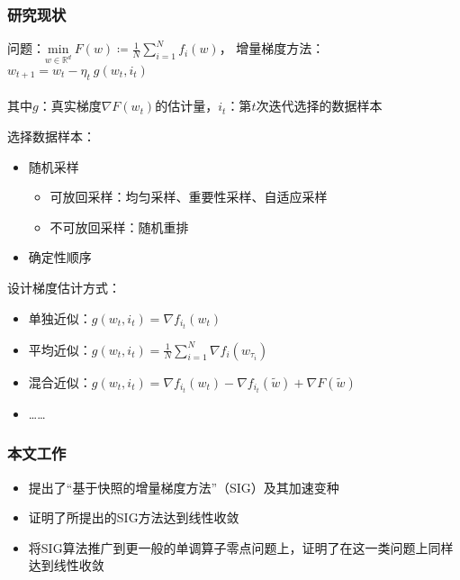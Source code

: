\frame
{
\frametitle{研究现状}
\footnotesize
问题：$\underset{w \in \mathbb{R}^d}{\text{min}} \ F(w) \coloneqq \frac{1}{N} \sum_{i=1}^N f_i(w) $， \pause 增量梯度方法：$w_{t+1} = w_t - \eta_t \ g(w_t, i_t)$ \\~\\
\pause 其中$g$：真实梯度$\nabla F(w_t)$的估计量，$i_t$：第$t$次迭代选择的数据样本

\pause

\begin{block}{}
选择数据样本：
\begin{itemize}
    \item 随机采样
    \begin{itemize}
        \item \alert<6>{可放回采样}：均匀采样、重要性采样、自适应采样
        \item 不可放回采样：随机重排
    \end{itemize}
    \item 确定性顺序
\end{itemize}
\end{block}

\pause

\begin{block}{}
设计梯度估计方式：
\begin{itemize}
    \item 单独近似：$g(w_t, i_t) = \nabla f_{i_t}(w_t)$
    \item \alert<6>{平均近似}：$g(w_t, i_t) = \frac{1}{N}\sum_{i=1}^N\nabla f_i(w_{\tau_i})$
    \item \alert<6>{混合近似}：$g(w_t, i_t) = \nabla f_{i_t}(w_t) - \nabla f_{i_t}(\tilde{w}) + \nabla F(\tilde{w})$
    \item \alert<6>{……}
\end{itemize}
\end{block}

}

\frame
{
\frametitle{本文工作}
\begin{itemize}
  \item 提出了“基于快照的增量梯度方法”（SIG）及其加速变种 \vspace*{1em}
  \item 证明了所提出的SIG方法达到线性收敛 \vspace*{1em}
  \item 将SIG算法推广到更一般的单调算子零点问题上，证明了在这一类问题上同样达到线性收敛
\end{itemize}
}

\miniframeson
